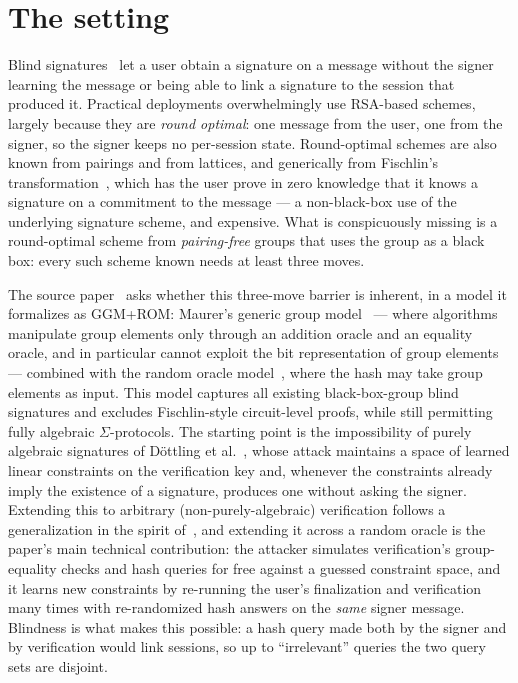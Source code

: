 \documentclass{aicr-conjecture}
\begin{document}
\section{The setting}\label{sec:setting}

Blind signatures~\cite{Cha82} let a user obtain a signature on a message
without the signer learning the message or being able to link a
signature to the session that produced it. Practical deployments
overwhelmingly use RSA-based schemes, largely because they are
\emph{round optimal}: one message from the user, one from the signer, so
the signer keeps no per-session state. Round-optimal schemes are also
known from pairings and from lattices, and generically from Fischlin's
transformation~\cite{Fis06}, which has the user prove in zero knowledge
that it knows a signature on a commitment to the message --- a
non-black-box use of the underlying signature scheme, and expensive.
What is conspicuously missing is a round-optimal scheme from
\emph{pairing-free} groups that uses the group as a black box: every
such scheme known needs at least three moves.

The source paper~\cite{DKT26} asks whether this three-move barrier is
inherent, in a model it formalizes as GGM+ROM: Maurer's generic group
model~\cite{Mau05} --- where algorithms manipulate group elements only
through an addition oracle and an equality oracle, and in particular
cannot exploit the bit representation of group elements --- combined
with the random oracle model~\cite{BR93}, where the hash may take group
elements as input. This model captures all existing black-box-group
blind signatures and excludes Fischlin-style circuit-level proofs, while
still permitting fully algebraic $\Sigma$-protocols. The starting point
is the impossibility of purely algebraic signatures of D\"ottling et
al.~\cite{DHHKSU}, whose attack maintains a space of learned linear
constraints on the verification key and, whenever the constraints
already imply the existence of a signature, produces one without asking
the signer. Extending this to arbitrary (non-purely-algebraic)
verification follows a generalization in the spirit of~\cite{CFGG22},
and extending it across a random oracle is the paper's main technical
contribution: the attacker simulates verification's group-equality
checks and hash queries for free against a guessed constraint space, and
it learns new constraints by re-running the user's finalization and
verification many times with re-randomized hash answers on the
\emph{same} signer message. Blindness is what makes this possible: a
hash query made both by the signer and by verification would link
sessions, so up to ``irrelevant'' queries the two query sets are
disjoint.
\end{document}
